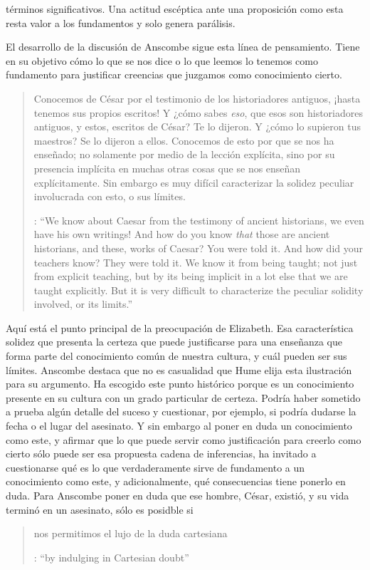 términos significativos. Una actitud escéptica ante una proposición como esta resta valor a los fundamentos y solo genera parálisis.

El desarrollo de la discusión de Anscombe sigue esta línea de pensamiento. Tiene en su objetivo cómo lo que se nos dice o lo que leemos lo tenemos como fundamento para justificar creencias que juzgamos como conocimiento cierto.

\blockquote[{\cite[90]{anscombe1981parmenides:humeandjulius}}: \enquote{We know about Caesar from the testimony of ancient historians, we even have his own writings! And how do you know \emph{that} those are ancient historians, and these, works of Caesar? You were told it. And how did your teachers know? They were told it. We know it from being taught; not just from explicit teaching, but by its being implicit in a lot else that we are taught explicitly. But it is very difficult to characterize the peculiar solidity involved, or its limits.}]{Conocemos de César por el testimonio de los historiadores antiguos, ¡hasta tenemos sus propios escritos! Y ¿cómo sabes \emph{eso}, que esos son historiadores antiguos, y estos, escritos de César? Te lo dijeron. Y ¿cómo lo supieron tus maestros? Se lo dijeron a ellos. Conocemos de esto por que se nos ha enseñado; no solamente por medio de la lección explícita, sino por su presencia implícita en muchas otras cosas que se nos enseñan explícitamente. Sin embargo es muy difícil caracterizar la solidez peculiar involucrada con esto, o sus límites.} Aquí está el punto principal de la preocupación de Elizabeth. Esa característica solidez que presenta la certeza que puede justificarse para una enseñanza que forma parte del conocimiento común de nuestra cultura, y cuál pueden ser sus límites. Anscombe destaca que no es casualidad que Hume elija esta ilustración para su argumento. Ha escogido este punto histórico porque es un conocimiento presente en su cultura con un grado particular de certeza. Podría haber sometido a prueba algún detalle del suceso y cuestionar, por ejemplo, si podría dudarse la fecha o el lugar del asesinato. Y sin embargo al poner en duda un conocimiento como este, y afirmar que lo que puede servir como justificación para creerlo como cierto sólo puede ser esa propuesta cadena de inferencias, ha invitado a cuestionarse qué es lo que verdaderamente sirve de fundamento a un conocimiento como este, y adicionalmente, qué consecuencias tiene ponerlo en duda. Para Anscombe poner en duda que ese hombre, César, existió, y su vida terminó en un asesinato, sólo es posidble si \blockquote[{\cite[Cf.~][90]{anscombe1981parmenides:humeandjulius}}: \enquote{by indulging in Cartesian doubt}]{nos permitimos el lujo de la duda cartesiana}.


